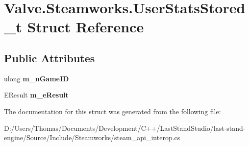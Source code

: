 \hypertarget{structValve_1_1Steamworks_1_1UserStatsStored__t}{}\section{Valve.\+Steamworks.\+User\+Stats\+Stored\+\_\+t Struct Reference}
\label{structValve_1_1Steamworks_1_1UserStatsStored__t}
\subsection*{Public Attributes}
\begin{DoxyCompactItemize}
\item 
\hypertarget{structValve_1_1Steamworks_1_1UserStatsStored__t_afa6a112c8399a9c590fa359bc2c2592b}{}ulong {\bfseries m\+\_\+n\+Game\+I\+D}\label{structValve_1_1Steamworks_1_1UserStatsStored__t_afa6a112c8399a9c590fa359bc2c2592b}

\item 
\hypertarget{structValve_1_1Steamworks_1_1UserStatsStored__t_a500bd71fec5d025cdc2440e7f1810dee}{}E\+Result {\bfseries m\+\_\+e\+Result}\label{structValve_1_1Steamworks_1_1UserStatsStored__t_a500bd71fec5d025cdc2440e7f1810dee}

\end{DoxyCompactItemize}


The documentation for this struct was generated from the following file\+:\begin{DoxyCompactItemize}
\item 
D\+:/\+Users/\+Thomas/\+Documents/\+Development/\+C++/\+Last\+Stand\+Studio/last-\/stand-\/engine/\+Source/\+Include/\+Steamworks/steam\+\_\+api\+\_\+interop.\+cs\end{DoxyCompactItemize}
